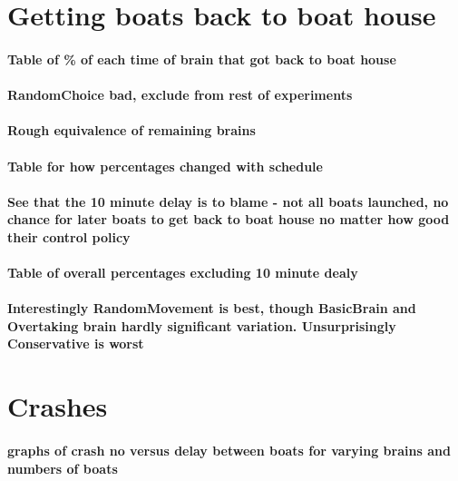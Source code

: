 \section{Getting boats back to boat house}
  \paragraph{Table of \% of each time of brain that got back to boat house}
  
  \paragraph{RandomChoice bad, exclude from rest of experiments}
  
  \paragraph{Rough equivalence of remaining brains}
  
  \paragraph{Table for how percentages changed with schedule}
  
  \paragraph{See that the 10 minute delay is to blame - not all boats launched, no chance for later boats to get back to boat house no matter how good their control policy}
  
  \paragraph{Table of overall percentages excluding 10 minute dealy}
  
  \paragraph{Interestingly RandomMovement is best, though BasicBrain and Overtaking brain hardly significant variation. Unsurprisingly Conservative is worst}
  
\section{Crashes}
  \paragraph{graphs of crash no versus delay between boats for varying brains and numbers of boats}
  

